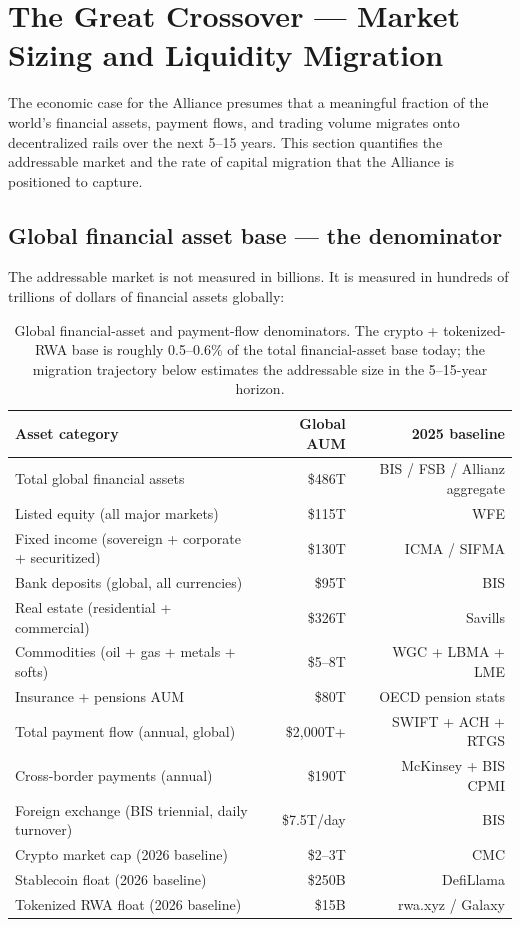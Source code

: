 \section{The Great Crossover --- Market Sizing and Liquidity Migration}

The economic case for the Alliance presumes that a meaningful fraction
of the world's financial assets, payment flows, and trading volume
migrates onto decentralized rails over the next 5--15 years. This
section quantifies the addressable market and the rate of capital
migration that the Alliance is positioned to capture.

\subsection{Global financial asset base --- the denominator}

The addressable market is not measured in billions. It is measured in
hundreds of trillions of dollars of financial assets globally:

\begin{table}[H]
\centering
\small
\begin{tabularx}{\textwidth}{X r r}
\toprule
\textbf{Asset category} & \textbf{Global AUM} & \textbf{2025 baseline}\\
\midrule
Total global financial assets & \$486T & BIS / FSB / Allianz aggregate\\
Listed equity (all major markets) & \$115T & WFE \\
Fixed income (sovereign + corporate + securitized) & \$130T & ICMA / SIFMA \\
Bank deposits (global, all currencies) & \$95T & BIS \\
Real estate (residential + commercial) & \$326T & Savills \\
Commodities (oil + gas + metals + softs) & \$5--8T & WGC + LBMA + LME \\
Insurance + pensions AUM & \$80T & OECD pension stats \\
\midrule
Total payment flow (annual, global) & \$2,000T+ & SWIFT + ACH + RTGS \\
Cross-border payments (annual) & \$190T & McKinsey + BIS CPMI \\
Foreign exchange (BIS triennial, daily turnover) & \$7.5T/day & BIS \\
\midrule
Crypto market cap (2026 baseline) & \$2--3T & CMC \\
Stablecoin float (2026 baseline) & \$250B & DefiLlama \\
Tokenized RWA float (2026 baseline) & \$15B & rwa.xyz / Galaxy \\
\bottomrule
\end{tabularx}
\caption{Global financial-asset and payment-flow denominators. The
crypto + tokenized-RWA base is roughly 0.5--0.6\% of the total
financial-asset base today; the migration trajectory below estimates the
addressable size in the 5--15-year horizon.}
\end{table}

